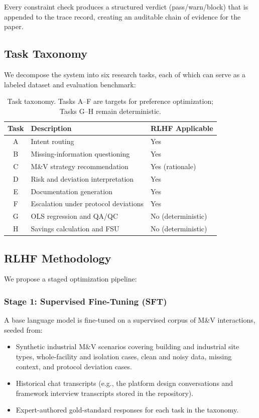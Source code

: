 \documentclass[11pt,a4paper]{article}
\begin{document}
Every constraint check produces a structured verdict (pass/warn/block) that is appended to the trace record, creating an auditable chain of evidence for the paper.

\subsection{Task Taxonomy}

We decompose the system into six research tasks, each of which can serve as a labeled dataset and evaluation benchmark:

\begin{table}[h]
\centering
\begin{tabular}{c l l}
\hline
\textbf{Task} & \textbf{Description} & \textbf{RLHF Applicable} \\
\hline
A & Intent routing & Yes \\
B & Missing-information questioning & Yes \\
C & M\&V strategy recommendation & Yes (rationale) \\
D & Risk and deviation interpretation & Yes \\
E & Documentation generation & Yes \\
F & Escalation under protocol deviations & Yes \\
\hline
G & OLS regression and QA/QC & No (deterministic) \\
H & Savings calculation and FSU & No (deterministic) \\
\hline
\end{tabular}
\caption{Task taxonomy. Tasks A--F are targets for preference optimization; Tasks G--H remain deterministic.}
\label{tab:taxonomy}
\end{table}

\subsection{RLHF Methodology}

We propose a staged optimization pipeline:

\subsubsection{Stage 1: Supervised Fine-Tuning (SFT)}
A base language model is fine-tuned on a supervised corpus of M\&V interactions, seeded from:
\begin{itemize}
    \item Synthetic industrial M\&V scenarios covering building and industrial site types, whole-facility and isolation cases, clean and noisy data, missing context, and protocol deviation cases.
    \item Historical chat transcripts (e.g., the platform design conversations and framework interview transcripts stored in the repository).
    \item Expert-authored gold-standard responses for each task in the taxonomy.
\end{itemize}
\end{document}
